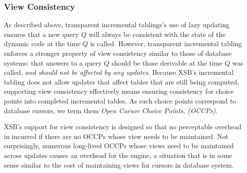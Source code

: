 \subsubsection{View Consistency} \label{sec:view-consistency}
%
As described above, transparent incremental tablings's use of lazy
updating ensures that a new query $Q$ will always be consistent with
the state of the dynamic code at the time $Q$ is called.  However,
transparent incremental tabling enforces a stronger property of view
consistency similar to those of database systems: that answers to a
query $Q$ should be those derivable at the time $Q$ was called, {\em
  and should not be affected by any updates}.
Because XSB's incremental tabling does not allow updates that affect
tables that are still being computed, supporting view consistency
effectively means ensuring consistency for choice points into
completed incremental tables.  As such choice points correspond to
database cursors, we term them {\em Open Cursor Choice Points,
  (OCCPs)}.

XSB's support for view consistency is designed so that no perceptable
overhead in incurred if there are no OCCPs whose view needs to be
maintained.  Not surprisingly, numerous long-lived OCCPs whose views
need to be maintained across updates causes an overhead for the
engine, a situation that is in some sense similar to the cost of
maintaining views for cursors in database system.

